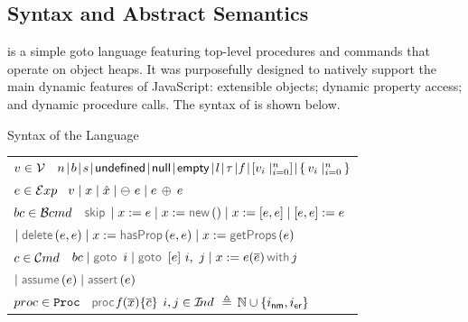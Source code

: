 \vspace*{-0.2cm}
\subsection{\jsil Syntax and Abstract Semantics}\label{subsec:jsil:analysis:formalism}

\vspace*{-0.1cm}
 \jsil is a simple goto language featuring top-level procedures and commands that operate on object heaps. It was purposefully designed to natively support the main dynamic features of JavaScript: extensible objects; dynamic property access; and dynamic procedure calls. The syntax of \jsil is shown below. 

\vspace{5pt}
\begin{display}{Syntax of the \jsil Language}{
\begin{tabular}{l}
$v \in \mathcal{V}$ \ $\jnumber \! \mid \! \jbool \! \mid \! \jstring \! \mid \! {\small \jundefined} \! \mid \! {\small \jnull} \! \mid \! {\small \jempty} \! \mid \! \loc \! \mid \! \jtype \! \mid \!  \pid \! 
         \mid \! \jsillist{\val_i \mid_{i=0}^n} \! \mid \! \jsilset{\val_i \mid_{i=0}^n}$
   \\[0.1cm]
  $e \in \mathcal{E}xp$ \ $v \mid x \mid \hat{x} \mid \ominus\ e \mid e \, \oplus_{} \, e$
 \\[0.1cm]
%
$bc \in \mathcal{B}cmd$ \ $\jsilskip \mid \jvar := \jsilexpr  \mid \jvar := \jsilnew() \mid \jvar := [\jsilexpr, \jsilexpr] \mid [\jsilexpr, \jsilexpr] := \jsilexpr $ \\
%
\hspace{0.02cm} $\mid \jsildelete(\jsilexpr, \jsilexpr) \mid \jvar := \hasfield(\jsilexpr, \jsilexpr) \mid \jvar := \getfields(\jsilexpr)$ \\[0.1cm]
$c \in \mathcal{C}md$  \ $ \bcmd \mid \goto \ i \mid  \ifgoto{\jsilexpr}{i}{j} \mid \jsilcall{\jvar}{\jsilexpr}{\jvec{\jsilexpr}}{j}$ \\
\hspace{0.02cm} $ \mid \assume(\jsilexpr) \mid \jassert(\jsilexpr)$ \\[0.1cm]
%
$proc \in \mathtt{Proc}$  \ $\procedure{\pid}{\jvec{\jvar}}{\jvec{\jcmd}}$
\hspace{0.6cm}
$i, j \in \mathcal{I}\hspace{-2pt}nd$ $\,\triangleq\, \mathbb{N} \cup \{ i_{{\sf nm}}, i_{{\sf er}} \}$
 \end{tabular}}
\end{display}

